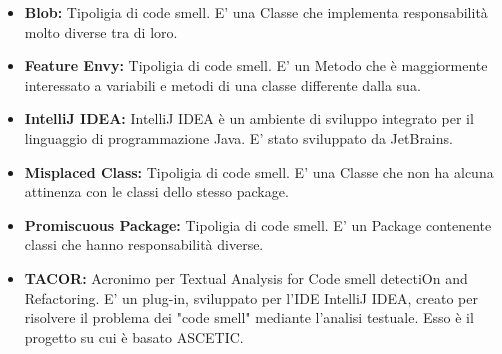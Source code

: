 
\begin{itemize}
	   			
	   			\item \textbf{Blob:} Tipoligia di code smell. E' una Classe che implementa responsabilità molto diverse tra di loro.
	   			
	   			\item \textbf{Feature Envy:} Tipoligia di code smell. E' un Metodo che è maggiormente interessato a variabili e metodi di una classe differente dalla sua.
	   			
	   			\item \textbf{IntelliJ IDEA:} IntelliJ IDEA è un ambiente di sviluppo integrato per il linguaggio di programmazione Java. E' stato sviluppato da JetBrains.
	   			
	   			\item \textbf{Misplaced Class:} Tipoligia di code smell. E' una Classe che non ha alcuna attinenza con le classi dello stesso package.
	   			
	   			\item \textbf{Promiscuous Package:} Tipoligia di code smell. E' un Package contenente classi che hanno responsabilità diverse.
	   			
	   			\item \textbf{TACOR:} Acronimo per Textual Analysis for Code smell detectiOn and Refactoring. E' un plug-in, sviluppato per l'IDE IntelliJ IDEA, creato per risolvere il problema dei "code smell" mediante l'analisi testuale. Esso è il progetto su cui è basato ASCETIC.
	   			
\end{itemize}
